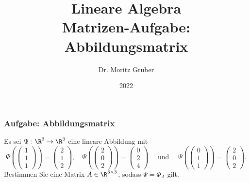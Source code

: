 

\title{Lineare Algebra\\[3mm] 
	\large Matrizen-Aufgabe: Abbildungsmatrix
}
\author{Dr. Moritz Gruber} 
\date{2022}



%
\begin{frame}[plain] 
 \titlepage
\end{frame}
%
\begin{frame}\frametitle{Aufgabe: Abbildungsmatrix}
%
Es sei $\Psi: \R^3 \to \R^3$ eine lineare Abbildung mit
$$
\Psi(\begin{pmatrix}1\\1\\1 \end{pmatrix}) = \begin{pmatrix}2 \\ 1 \\ 2 \end{pmatrix}, \quad \Psi(\begin{pmatrix} 2 \\ 0\\ 2 \end{pmatrix}) = \begin{pmatrix}0\\2\\4 \end{pmatrix} \quad \text{ und } \quad \Psi(\begin{pmatrix} 0\\1\\1\end{pmatrix} )= \begin{pmatrix} 2 \\ 0 \\ 2\end{pmatrix}.
$$
Bestimmen Sie eine Matrix $A \in \R^{3\times 3}$, sodass $\Psi=\Phi_A$ gilt. 

%
\end{frame}
%
%
